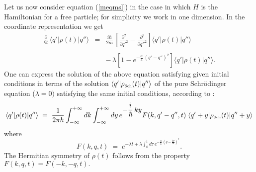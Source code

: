 \documentclass[12pt]{article}
\begin{document}
Let us now consider equation (\ref{meqmsl}) in the case in which
$H$ is the Hamiltonian for a free particle; for simplicity we work
in one dimension. In the coordinate representation we get
\begin{eqnarray} \label{mepr}
\frac{\partial}{\partial t}\, \langle q'|\rho(t)| q''\rangle & = &
\frac{i\hbar}{2m}\, \left[\frac{\partial^{2}}{\partial {q'}^{2}} -
\frac{\partial^{2}}{\partial {q''}^{2}}\right] \langle q'|\rho(t)|
q''\rangle
\nonumber \\
& & \nonumber \\
& & -\,\lambda \left[ 1 - e^{\displaystyle - \frac{\alpha}{4}\,
(q' - q'')^{2}} \right] \langle q'|\rho(t)| q''\rangle.
\end{eqnarray}
One can express the solution of the above equation satisfying
given initial conditions in terms of the solution $\langle q' |
\rho_{\makebox{\tiny Sch}}(t) | q''\rangle$ of the pure
Schr\"odinger equation ($\lambda = 0)$ satisfying the same initial
conditions, according to \cite{grw}:
\begin{equation} \label{gfh}
\langle q'|\rho(t)| q''\rangle \; = \;
\frac{1}{2\pi\hbar}\int_{-\infty}^{+\infty} dk
\int_{-\infty}^{+\infty} dy\, e^{\displaystyle
-\frac{i}{\hbar}\,ky} F(k, q'-q'', t)\; \langle q' + y |
\rho_{\makebox{\tiny Sch}}(t) | q'' + y \rangle
\end{equation}
where
\begin{equation} \label{rcf}
F(k,q,t) \; = \; e^{\displaystyle -\lambda t + \lambda
\int_{0}^{t} d\tau\, e^{\displaystyle -\frac{\alpha}{4}\, \left( q
- \frac{k\tau}{m}\right)^{2}}}.
\end{equation}
The Hermitian symmetry of $\rho(t)$ follows from the property
$F(k,q,t) = F(-k, -q, t).$
\end{document}
